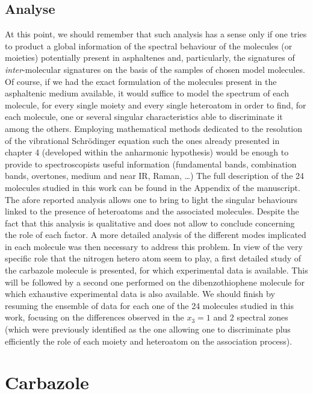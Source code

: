 \subsection{Analyse}

At this point, we should remember that such analysis has a sense only if one tries to product a global information of the spectral behaviour of the molecules (or moieties) potentially present in asphaltenes and, particularly, the signatures of \textit{inter}-molecular signatures on the basis of the samples of chosen model molecules. Of course, if we had the exact formulation of the molecules present in the asphaltenic medium available, it would suffice to model the spectrum of each molecule, for every single moiety and every single heteroatom in order to find, for each molecule, one or several singular characteristics able to discriminate it among the others. Employing mathematical methods dedicated to the resolution of the vibrational Schr\"{o}dinger equation such the ones already presented in chapter 4 (developed within the anharmonic hypothesis) would be enough to provide to spectroscopists useful information (fundamental bands, combination bands, overtones, medium and near IR, Raman, …) The full description of the 24 molecules studied in this work can be found in the Appendix of the manuscript.\\  

The afore reported analysis allows one to bring to light the singular behaviours linked to the presence of heteroatoms and the associated molecules. Despite the fact that this analysis is qualitative and does not allow to conclude concerning the role of each factor. A more detailed analysis of the different modes implicated in each molecule was then necessary to address this problem. In view of the very specific role that the nitrogen hetero atom seem to play, a first detailed study of the carbazole molecule is presented, for which experimental data is available. This will be followed by a second one performed on the dibenzothiophene molecule for which exhaustive experimental data is also available. We should finish by resuming the ensemble of data for each one of the 24 molecules studied in this work, focusing on the differences observed in the $x_3=1$ and $2$ spectral zones (which were previously identified as the one allowing one to discriminate plus efficiently the role of each moiety and heteroatom on the association process).	

\section{Carbazole}

